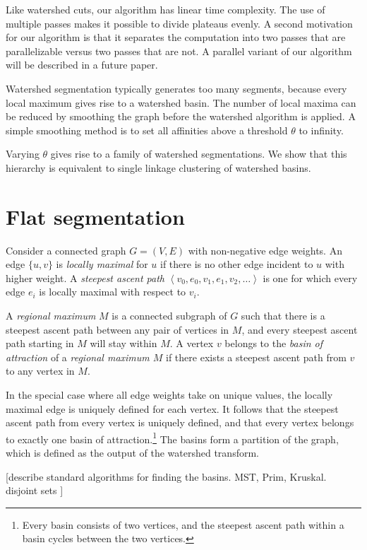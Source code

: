 \documentclass{article}
\begin{document}
Like watershed cuts, our algorithm has linear time complexity.  The
use of multiple passes makes it possible to divide plateaus evenly.  A
second motivation for our algorithm is that it separates the
computation into two passes that are parallelizable versus two passes
that are not.  A parallel variant of our algorithm will be described
in a future paper.

Watershed segmentation typically generates too many segments, because
every local maximum gives rise to a watershed basin.  The number of
local maxima can be reduced by smoothing the graph before the
watershed algorithm is applied.  A simple smoothing method is to set
all affinities above a threshold $\theta$ to infinity.

Varying $\theta$ gives rise to a family of watershed segmentations.  We show that this hierarchy is equivalent to single linkage clustering of watershed basins. 

\section{Flat segmentation}
Consider a connected graph $G=(V,E)$ with non-negative edge
weights. An edge $\{u,v\}$ is \emph{locally maximal} for
$u$ if there is no other edge incident to $u$ with higher weight.  A
\emph{steepest ascent path} $\left\langle
v_{0},e_{0},v_{1},e_{1},v_{2}, \dots \right\rangle$ is one
for which every edge $e_{i}$ is locally maximal with respect to
$v_{i}.$

A \emph{regional maximum} $M$ is a connected subgraph of $G$ such that
there is a steepest ascent path between any pair of vertices in $M$,
and every steepest ascent path starting in $M$ will
stay within $M$. A vertex $v$ belongs to the \emph{basin of
  attraction} of a \emph{regional maximum $M$} if there exists a
steepest ascent path from $v$ to any vertex in $M$.

In the special case where all edge weights take on unique values, the
locally maximal edge is uniquely defined for each vertex.  It follows
that the steepest ascent path from every vertex is uniquely defined,
and that every vertex belongs to exactly one basin of
attraction.\footnote{Every basin consists of two vertices, and the
  steepest ascent path within a basin cycles between the two
  vertices.}  The basins form a partition of the graph, which is
defined as the output of the watershed transform.

[describe standard algorithms for finding the basins.  MST, Prim, Kruskal. disjoint sets ]
\end{document}
